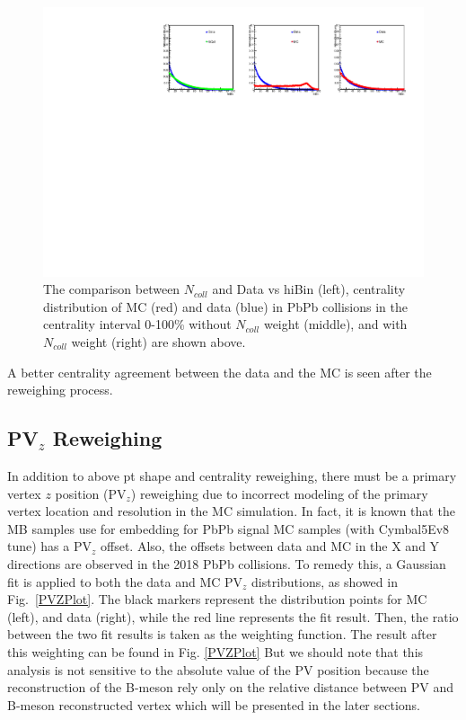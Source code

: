\begin{figure}[hbtp]
\begin{center}
\includegraphics[width=1.10\textwidth]{Figures/Chapter5/CentralityWeight.pdf}
\caption{The comparison between $N_{coll}$ and Data vs hiBin (left), centrality distribution of MC (red) and data (blue) in PbPb collisions in the centrality interval 0-100\% without $N_{coll}$ weight (middle), and with $N_{coll}$ weight (right) are shown above.}
\label{CentComp}
\end{center}
\end{figure} 


A better centrality agreement between the data and the MC is seen after the reweighing process. 

\subsection{PV$_{z}$ Reweighing}


In addition to above pt shape and centrality reweighing, there must be a primary vertex $z$ position (PV$_{z}$) reweighing due to incorrect modeling of the primary vertex location and resolution in the MC simulation. In fact, it is known that the MB samples use for embedding for PbPb signal MC samples (with Cymbal5Ev8 tune) has a PV$_{z}$ offset. Also, the offsets between data and MC in the X and Y directions are observed in the 2018 PbPb collisions. To remedy this, a Gaussian fit is applied to both the data and MC PV$_{z}$ distributions, as showed in Fig.~\ref{PVZPlot}. The black markers represent the distribution points for MC (left), and data (right), while the red line represents the fit result. Then, the ratio between the two fit results is taken as the weighting function. The result after this weighting can be found in Fig. \ref{PVZPlot} But we should note that this analysis is not sensitive to the absolute value of the PV position because the reconstruction of the B-meson rely only on the relative distance between PV and B-meson reconstructed vertex which will be presented in the later sections.


